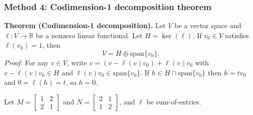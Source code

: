 \documentclass[12pt]{article}
\newcommand{\R}{\mathbb{R}}
\begin{document}
\newpage

\subsubsection{Method 4: Codimension-1 decomposition theorem}
\textbf{Theorem (Codimension-1 decomposition).}
Let $V$ be a vector space and $\ell:V\to\R$ be a nonzero linear functional. Let $H=\ker(\ell)$.
If $v_0\in V$ satisfies $\ell(v_0)=1$, then
\[
V=H\oplus \mathrm{span}\{v_0\}.
\]
\emph{Proof:} For any $v\in V$, write $v=(v-\ell(v)v_0)+\ell(v)v_0$ with $v-\ell(v)v_0\in H$ and $\ell(v)v_0\in\mathrm{span}\{v_0\}$.
If $h\in H\cap \mathrm{span}\{v_0\}$ then $h=tv_0$ and $0=\ell(h)=t$, so $h=0$.

\medskip

Let $M=\begin{bmatrix}1&2\\2&1\end{bmatrix}$ and $N=\begin{bmatrix}2&1\\1&2\end{bmatrix}$, and $\ell$ be sum-of-entries.
\end{document}
